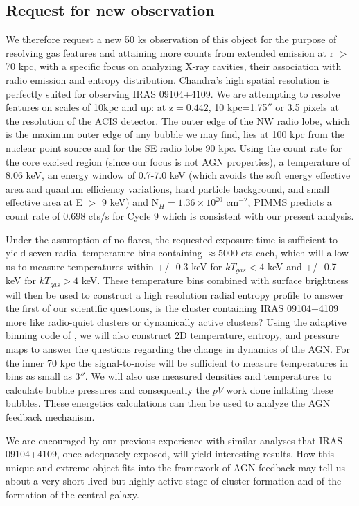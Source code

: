 \documentclass[letterpaper,11pt,twocolumn]{article}
\begin{document}
\subsection{Request for new observation}
We therefore request a new 50 ks observation of this object for the
purpose of resolving gas features and attaining more counts from extended
emission at r $>$ 70 kpc,
with a specific focus on analyzing X-ray cavities, their
association with radio emission and entropy distribution.
Chandra's high spatial resolution is perfectly suited for observing
IRAS 09104+4109. We are attempting to resolve features on scales of
10kpc and up: at z$= 0.442$, 10 kpc=1.75$''$ or 3.5 pixels at the
resolution of the ACIS detector. The outer edge of the NW radio lobe, which is
the maximum outer edge of any bubble we may find, lies at 100 kpc
from the nuclear point source and for the SE radio lobe 90 kpc.
 Using the
count rate for the core excised region (since our focus is not AGN properties), a temperature
of 8.06 keV, an energy window of 0.7-7.0 keV (which avoids the soft
energy effective area and quantum efficiency variations, hard particle
background, and small effective area at E $>$ 9 keV) and N$_{H} = 1.36\times10^{20}
$ cm$^{-2}$, PIMMS predicts a count rate of 0.698 cts/s for Cycle
9 which is consistent with our present analysis.

Under the assumption of no flares, the requested exposure time is
sufficient to yield seven radial temperature bins containing $\approx
5000$ cts each, which will allow us to measure temperatures within
+/- 0.3 keV for $kT_{gas} < 4$ keV and +/- 0.7 keV for $kT_{gas} > 4$ keV. These
temperature bins combined with surface brightness will then be used to
construct a high resolution radial entropy profile to answer the first of our
scientific questions, is the cluster containing IRAS 09104+4109 more like radio-quiet
clusters or dynamically active clusters?
Using the adaptive binning code of \cite{2006MNRAS.368..497D}, we
will also construct 2D temperature, entropy, and pressure maps to answer the
questions regarding the change in dynamics of the AGN. For the inner
70 kpc the signal-to-noise will be sufficient to measure
temperatures in bins as small as 3$''$. We will also use measured
densities and temperatures to calculate bubble pressures and consequently
the $pV$ work done inflating these bubbles. These energetics calculations
can then be used to analyze the AGN feedback mechanism.

We are encouraged by our previous experience with similar analyses
that IRAS 09104+4109, once adequately exposed, will yield interesting results.
How this unique and extreme object fits into the framework of AGN
feedback may tell us about a very short-lived but highly active stage
of cluster formation and of the formation of the central galaxy.


\end{document}
